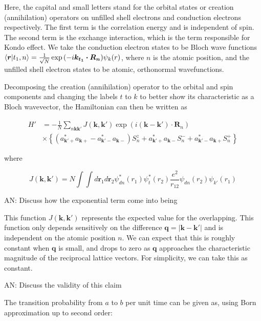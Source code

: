\documentclass{article}
\begin{document}
Here, the capital and small letters stand for the orbital states or creation (annihilation) operators on unfilled shell electrons and conduction electrons respectively. The first term is the correlation energy and is independent of spin. The second term is the exchange interaction, which is the term responsible for Kondo effect. We take the conduction electron states to be Bloch wave functions $\braket{\bm{r}|t_1,n} = 
\frac{1}{\sqrt{N}}\exp{(-i\bm{k_{t_1} \cdot  R_n})}\psi_{k}(r)$, where $n$ is the atomic position, and the unfilled shell electron states to be atomic, orthonormal wavefunctions.

Decomposing the creation (annihilation) operator to the orbital and spin components and changing the labels $t$ to $k$ to better show its characteristic as a Bloch wavevector, the Hamiltonian can then be written as

\begin{equation}
\begin{split}
    H' &= -\frac{1}{N} 
    \sum_{n\bm{kk'}}J(\bm{k, k'})\exp{(i(\bm{k-k'})\cdot \bm{R}_{n})}\\
    &\times\left\{( a_{\bm{k'}+}^* a_{\bm{k}+} - a_{\bm{k'}-}^* a_{\bm{k}-}) S^z_n +  a_{\bm{k'}+}^* a_{\bm{k}-} S^-_n + a_{\bm{k'}-}^* a_{\bm{k}+} S^+_n \right\}
\end{split}
\end{equation}

where 

\begin{equation}
    J(\bm{k},\bm{k}')= N\int\int d\bm{r}_1 d\bm{r}_2 \psi_{dn}^{*}(r_1)\psi_{t}^{*}(r_2) \frac{e^2}{r_{12}} \psi_{dn}(r_2)\psi_{k'}(r_1) 
\end{equation}

{\color{red} AN: Discuss how the exponential term come into being}

This function $J(\bm{k},\bm{k}')$ represents the expected value for the overlapping. This function only depends sensitively on the difference $\bm{q}=|\bm{k}-\bm{k}'|$ and is independent on the atomic position $n$. We can expect that this is roughly constant when $\bm{q}$ is small, and drops to zero as $\bm{q}$ approaches the characteristic magnitude of the reciprocal lattice vectors. For simplicity, we can take this as constant.

{\color{red} AN: Discuss the validity of this claim} 

The transition probability from $a$ to $b$ per unit time can be given as, using Born approximation up to second order:
\end{document}
